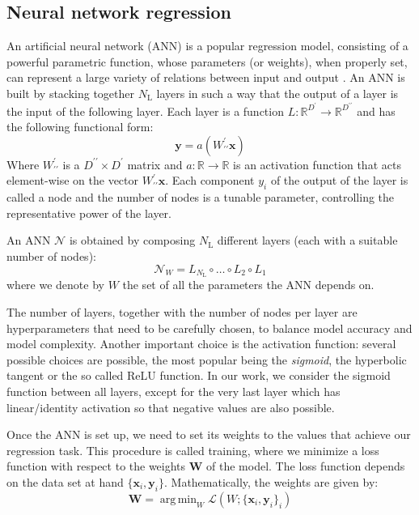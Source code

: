 \documentclass[twocolumn,showpacs,preprintnumbers,nofootinbib,prd,
superscriptaddress,10pt]{revtex4-1}
\newcommand{\R}{\mathbb{R}}
\DeclareMathOperator*{\argmin}{arg\,min}
\begin{document}

\subsection{Neural network regression}
\label{sec:NN}

An artificial neural network (ANN) is a popular regression model, consisting of a powerful parametric function, 
whose parameters (or weights), when properly set, can represent a large variety of relations between input and output \cite{Bishop2006machinelearning, murphy2012machine, Goodfellow-et-al-2016}.
An ANN is built by stacking together $N_\text{L}$ layers in such a way that the output of a layer is the input of the 
following layer. Each layer is a function $L: \R^{D^\prime} \rightarrow \R^{D^{\prime\prime}} $ and has the following 
functional form:
\begin{equation}
	\boldsymbol{y} = a(W^{\prime}_{\prime\prime}\boldsymbol{x})
\end{equation}
%
Where $W^{\prime}_{\prime\prime}$ is a $D^{\prime\prime} \times D^{\prime}$ matrix and $a: \R \rightarrow \R$ is an activation function that acts element-wise on the vector $W^{\prime}_{\prime\prime}\boldsymbol{x}$.
Each component $y_i$ of the output of the layer is called a node and the number of nodes is a tunable parameter, controlling the representative power of the layer.

An ANN $\mathcal{N}$ is obtained by composing $N_\text{L}$ different layers (each with a suitable number of nodes):
%
\begin{equation}
	\mathcal{N}_W = L_{N_\text{L}} \circ \hdots \circ L_2 \circ L_1
\end{equation}
%
where we denote by $W$ the set of all the parameters the ANN depends on.

The number of layers, together with the number of nodes per layer are hyperparameters that need to be carefully chosen, to balance model accuracy and model complexity.
Another important choice is the activation function: several possible choices are possible, the most popular being the {\it sigmoid}, the hyperbolic tangent or the so called ReLU function. In our work, we consider the sigmoid function between all layers, except for the very last layer which has linear/identity activation so that negative values are also possible.

Once the ANN is set up, we need to set its weights to the values that achieve our regression task.
This procedure is called training, where we minimize a loss function with respect to the weights $\boldsymbol{W}$ of the model.
The loss function depends on the data set at hand ${\{\boldsymbol{x}_i, \boldsymbol{y}_i\}}$.
Mathematically, the weights are given by:
%
\begin{equation}\label{eq:loss_general}
	\boldsymbol{W} = \argmin_W \mathcal{L}(W; \{\boldsymbol{x}_i, \boldsymbol{y}_i\}_i)
\end{equation}
\end{document}
